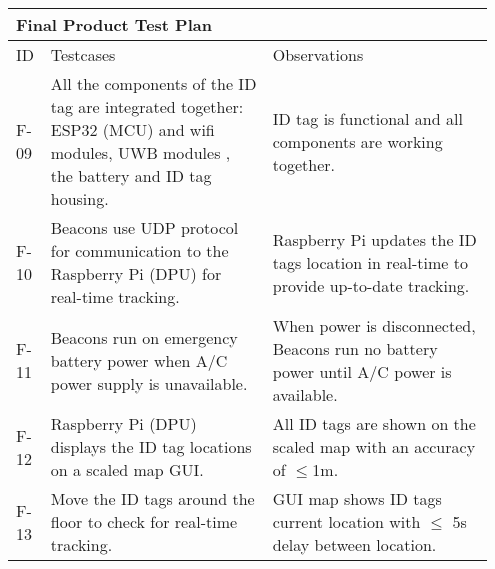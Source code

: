 \begin{table}[h!]
    \centering
    
    \begin{tabular}{|m{0.05\linewidth}|m{0.45\linewidth}|m{0.45\linewidth}|} 
    \hline
    \multicolumn{3}{|l|}{\textbf{Final Product Test Plan}}      \\ 
    \hline
    ID   & Testcases    & Observations     \\ 
    \hline

    F-09
    & All the components of the ID tag are integrated together: ESP32 (MCU) and wifi modules, UWB modules
    , the battery and ID tag housing.
    & ID tag is functional and all components are working together.  \\ 
    \hline

    F-10
    & Beacons use UDP protocol for communication to the Raspberry Pi (DPU) for real-time tracking.
    & Raspberry Pi updates the ID tags location in real-time to provide up-to-date tracking.  \\ 
    \hline

    F-11
    & Beacons run on emergency battery power when A/C power supply is unavailable.
    & When power is disconnected, Beacons run no battery power until A/C power is available.  \\ 
    \hline


    F-12
    & Raspberry Pi (DPU) displays the ID tag locations on a scaled map GUI.
    & All ID tags are shown on the scaled map with an accuracy of $\leq$1m.  \\ 
    \hline
    
    F-13
    & Move the ID tags around the floor to check for real-time tracking.
    & GUI map shows ID tags current location with 	$\leq$ 5s delay between location. \\ 
    \hline


\end{tabular}
\end{table}
